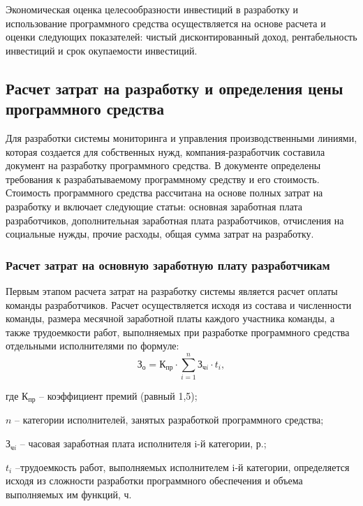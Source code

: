Экономическая оценка целесообразности инвестиций в разработку и использование программного средства осуществляется на основе расчета и оценки следующих показателей: чистый дисконтированный доход, рентабельность инвестиций и срок окупаемости инвестиций.

\subsection{Расчет затрат на разработку и определения цены программного средства}

Для разработки системы мониторинга и управления производственными линиями, которая создается для собственных нужд, компания-разработчик составила документ на разработку программного средства. В документе определены требования к разрабатываемому программному средству и его стоимость. Стоимость программного средства рассчитана на основе полных затрат на разработку и включает следующие статьи: основная заработная плата разработчиков, дополнительная заработная плата разработчиков, отчисления на социальные нужды, прочие расходы, общая сумма затрат на разработку.

\subsubsection{Расчет затрат на основную заработную плату разработчикам}
Первым этапом расчета затрат на разработку системы является расчет оплаты команды разработчиков. 
Расчет осуществляется исходя из состава и численности команды, размера месячной заработной платы каждого участника команды, а также трудоемкости работ, выполняемых при разработке программного средства отдельными исполнителями по формуле:
\begin{equation}
    \mbox{З}_{\mbox{о}}=\mbox{К}_{\mbox{пр}}\cdot \sum_{i=1}^{n}{\mbox{З}_{\mbox{ч}i}\cdot t_{i}},
\end{equation}



    где	$\mbox{К}_{\mbox{пр}}$ -- коэффициент премий (равный 1,5); 
    
    $n$ -- категории исполнителей, занятых разработкой программного средства;
    
    $\mbox{З}_{\mbox{ч}i}$ -- часовая заработная плата исполнителя i-й категории, р.; 
    
    $t_{i}$ --трудоемкость работ, выполняемых исполнителем i-й категории, определяется исходя из сложности разработки программного обеспечения и объема выполняемых им функций, ч.
    

